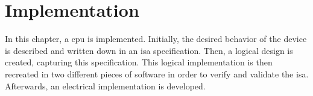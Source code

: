 \section{Implementation}

In this chapter, a \ac{cpu} is implemented. Initially, the desired behavior of the device is described and written down in an \ac{isa} specification. Then, a logical design is created, capturing this specification. This logical implementation is then recreated in two different pieces of software in order to verify and validate the \ac{isa}. Afterwards, an electrical implementation is developed. 




